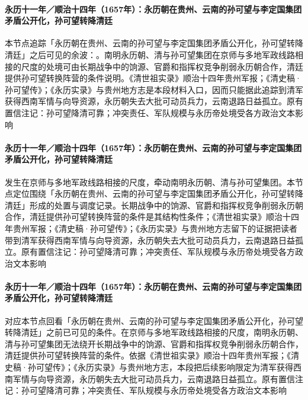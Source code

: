 \paragraph{永历十一年／顺治十四年（1657年）：永历朝在贵州、云南的孙可望与李定国集团矛盾公开化，孙可望转降清廷}
本节点追踪「永历朝在贵州、云南的孙可望与李定国集团矛盾公开化，孙可望转降清廷」之后可见的余波：。南明永历朝、清与孙可望集团在京师与多地军政线路相接的尺度的处境可由长期战争中的饷源、官爵和指挥权竞争削弱永历朝合作，清廷提供孙可望转换阵营的条件说明。《清世祖实录》顺治十四年贵州军报；《清史稿·孙可望传》；《永历实录》与贵州地方志是本段材料入口，因而只能据此追踪到清军获得西南军情与向导资源，永历朝失去大批可动员兵力，云南退路日益孤立。原有置信注记：孙可望降清可靠；冲突责任、军队规模与永历帝处境受各方政治文本影响

\paragraph{永历十一年／顺治十四年（1657年）：永历朝在贵州、云南的孙可望与李定国集团矛盾公开化，孙可望转降清廷}
 发生在京师与多地军政线路相接的尺度，牵动南明永历朝、清与孙可望集团。本节点定位围绕「永历朝在贵州、云南的孙可望与李定国集团矛盾公开化，孙可望转降清廷」形成的处置与调度记录。长期战争中的饷源、官爵和指挥权竞争削弱永历朝合作，清廷提供孙可望转换阵营的条件是其结构性条件；《清世祖实录》顺治十四年贵州军报；《清史稿·孙可望传》；《永历实录》与贵州地方志留下的证据把读者带到清军获得西南军情与向导资源，永历朝失去大批可动员兵力，云南退路日益孤立。原有置信注记：孙可望降清可靠；冲突责任、军队规模与永历帝处境受各方政治文本影响

\paragraph{永历十一年／顺治十四年（1657年）：永历朝在贵州、云南的孙可望与李定国集团矛盾公开化，孙可望转降清廷}
 对应本节点回看「永历朝在贵州、云南的孙可望与李定国集团矛盾公开化，孙可望转降清廷」之前已可见的条件。在京师与多地军政线路相接的尺度，南明永历朝、清与孙可望集团无法绕开长期战争中的饷源、官爵和指挥权竞争削弱永历朝合作，清廷提供孙可望转换阵营的条件。依据《清世祖实录》顺治十四年贵州军报；《清史稿·孙可望传》；《永历实录》与贵州地方志，本段把后续影响限定为清军获得西南军情与向导资源，永历朝失去大批可动员兵力，云南退路日益孤立。原有置信注记：孙可望降清可靠；冲突责任、军队规模与永历帝处境受各方政治文本影响

